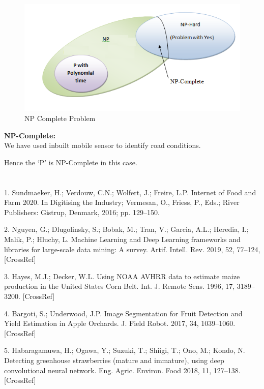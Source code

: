 \documentclass[oneside,a4paper,12pt]{report}
\begin{document}
\begin{appendices}
\begin{figure}[ht!]
	\centering
	\includegraphics[width=\linewidth]{npc.png}
	\caption{NP Complete Problem}
	\label{fig:NP Complete Problem}
\end{figure}

\textbf{NP-Complete:}\\

We have used inbuilt mobile sensor to identify road conditions.

Hence the ‘P’ is NP-Complete in this case.



\chapter{}
\item 1. Sundmaeker, H.; Verdouw, C.N.; Wolfert, J.; Freire, L.P. Internet of Food and Farm 2020. In Digitising the Industry; Vermesan, O.,
Friess, P., Eds.; River Publishers: Gistrup, Denmark, 2016; pp. 129–150.
\item 2. Nguyen, G.; Dlugolinsky, S.; Bobak, M.; Tran, V.; Garcia, A.L.; Heredia, I.; Malik, P.; Hluchy, L. Machine Learning and Deep Learning
frameworks and libraries for large-scale data mining: A survey. Artif. Intell. Rev. 2019, 52, 77–124, [CrossRef]
\item 3. Hayes, M.J.; Decker, W.L. Using NOAA AVHRR data to estimate maize production in the United States Corn Belt. Int. J.
Remote Sens. 1996, 17, 3189–3200. [CrossRef]
\item 4. Bargoti, S.; Underwood, J.P. Image Segmentation for Fruit Detection and Yield Estimation in Apple Orchards. J. Field Robot. 2017,
34, 1039–1060. [CrossRef]
\item 5. Habaragamuwa, H.; Ogawa, Y.; Suzuki, T.; Shiigi, T.; Ono, M.; Kondo, N. Detecting greenhouse strawberries (mature and immature), using deep convolutional neural network. Eng. Agric. Environ. Food 2018, 11, 127–138. [CrossRef]

\end{appendices}
\end{document}
